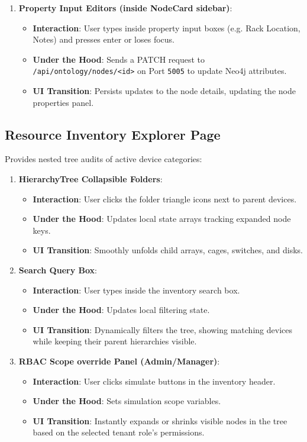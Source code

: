 \documentclass[11pt,a4paper]{article}
\begin{document}
\begin{enumerate}
    \item \textbf{Property Input Editors (inside NodeCard sidebar)}:
    \begin{itemize}
        \item \textbf{Interaction}: User types inside property input boxes (e.g. Rack Location, Notes) and presses enter or loses focus.
        \item \textbf{Under the Hood}: Sends a PATCH request to \texttt{/api/ontology/nodes/<id>} on Port \texttt{5005} to update Neo4j attributes.
        \item \textbf{UI Transition}: Persists updates to the node details, updating the node properties panel.
    \end{itemize}
\end{enumerate}

\subsection{Resource Inventory Explorer Page}
Provides nested tree audits of active device categories:
\begin{enumerate}
    \item \textbf{HierarchyTree Collapsible Folders}:
    \begin{itemize}
        \item \textbf{Interaction}: User clicks the folder triangle icons next to parent devices.
        \item \textbf{Under the Hood}: Updates local state arrays tracking expanded node keys.
        \item \textbf{UI Transition}: Smoothly unfolds child arrays, cages, switches, and disks.
    \end{itemize}
    
    \item \textbf{Search Query Box}:
    \begin{itemize}
        \item \textbf{Interaction}: User types inside the inventory search box.
        \item \textbf{Under the Hood}: Updates local filtering state.
        \item \textbf{UI Transition}: Dynamically filters the tree, showing matching devices while keeping their parent hierarchies visible.
    \end{itemize}
    
    \item \textbf{RBAC Scope override Panel (Admin/Manager)}:
    \begin{itemize}
        \item \textbf{Interaction}: User clicks simulate buttons in the inventory header.
        \item \textbf{Under the Hood}: Sets simulation scope variables.
        \item \textbf{UI Transition}: Instantly expands or shrinks visible nodes in the tree based on the selected tenant role's permissions.
    \end{itemize}
\end{enumerate}
\end{document}
